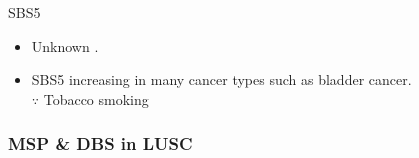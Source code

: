 \documentclass{beamer}
\begin{document}
\begin{frame}[allowframebreaks]
                    \begin{block}{SBS5}
                        \begin{itemize}
                            \item Unknown \cite{signature-02}.
                            \item SBS5 increasing in many cancer types such as bladder cancer. \\
                            $\because$ Tobacco smoking
                        \end{itemize}
                    \end{block}
                \end{frame}

                \begin{frame}
                    \frametitle{MSP \& DBS in LUSC}


\end{frame}
\end{document}
